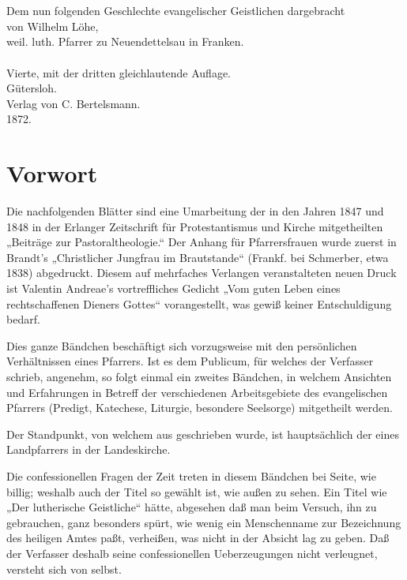 \begin{titelseite}
\\[1.5em]
\end{titelseite}

\begin{titelseite}
\\[1.5em]
Dem nun folgenden Geschlechte evangelischer Geistlichen dargebracht\\[1.5em]
von Wilhelm Löhe,\\
weil. luth. Pfarrer zu Neuendettelsau in Franken.\\[1.5em]
\\[1.5em]
Vierte, mit der dritten gleichlautende Auflage.\\[1.5em]
Gütersloh.\\
Verlag von C. Bertelsmann.\\
1872.
\end{titelseite}

\chapter{Vorwort}

Die nachfolgenden Blätter sind eine Umarbeitung der in den Jahren 1847 und 1848 in der Erlanger Zeitschrift für Protestantismus und Kirche mitgetheilten „Beiträge zur Pastoraltheologie.“ Der Anhang für Pfarrersfrauen wurde zuerst in Brandt’s „Christlicher Jungfrau im Brautstande“ (Frankf. bei Schmerber, etwa 1838) abgedruckt. Diesem auf mehrfaches Verlangen veranstalteten neuen Druck ist Valentin Andreae’s vortreffliches Gedicht „Vom guten Leben eines rechtschaffenen Dieners Gottes“ vorangestellt, was gewiß keiner Entschuldigung bedarf.

Dies ganze Bändchen beschäftigt sich vorzugsweise mit den persönlichen Verhältnissen eines Pfarrers. Ist es dem Publicum, für welches der Verfasser schrieb, angenehm, so folgt einmal ein zweites Bändchen, in welchem Ansichten und Erfahrungen in Betreff der verschiedenen Arbeitsgebiete des
evangelischen Pfarrers (Predigt, Katechese, Liturgie, besondere Seelsorge) mitgetheilt werden.

Der Standpunkt, von welchem aus geschrieben wurde, ist hauptsächlich der eines Landpfarrers in der Landeskirche.

Die confessionellen Fragen der Zeit treten in diesem Bändchen bei Seite, wie billig; weshalb auch der Titel so gewählt ist, wie außen zu sehen. Ein Titel wie „Der lutherische Geistliche“ hätte, abgesehen daß man beim Versuch, ihn zu gebrauchen, ganz besonders spürt, wie wenig ein Menschenname zur Bezeichnung des heiligen Amtes paßt, verheißen, was nicht in der Absicht lag zu geben. Daß der Verfasser deshalb seine confessionellen Ueberzeugungen nicht verleugnet, versteht sich von selbst.

